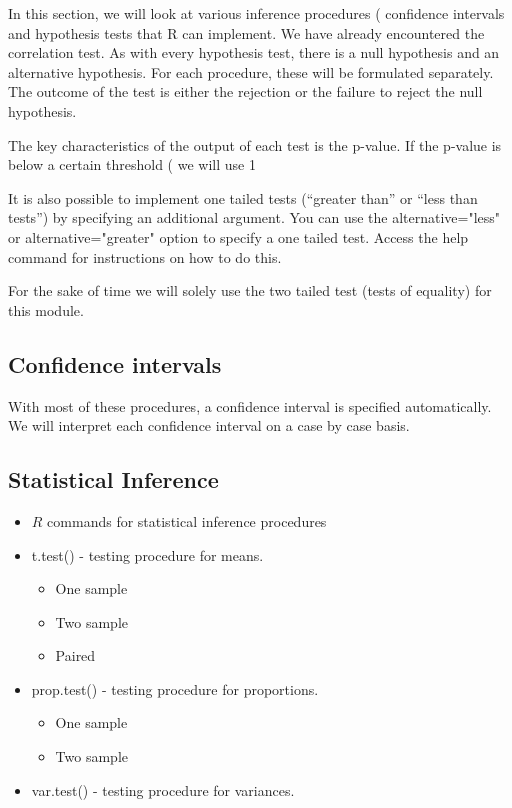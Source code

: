 \documentclass[a4paper,12pt]{article}
\begin{document}
\tableofcontents


In this section, we will look at various inference procedures ( confidence intervals and hypothesis tests that R can implement. We have already encountered the correlation test. 
As with every hypothesis test, there is a null hypothesis and an alternative hypothesis.
For each procedure, these will be formulated separately. The outcome of the test is either the rejection or the failure to reject the null hypothesis.

The key characteristics of the output of each test is the p-value. If the p-value is below a certain threshold ( we will use 1%

It is also possible to implement one tailed tests (“greater than” or “less than tests”) by specifying an additional argument. You can use the alternative="less" or alternative="greater" option to specify a one tailed test. Access the help command for instructions on how to do this. 

For the sake of time we will solely use the two tailed test (tests of equality) for this 
module.

\subsection{Confidence intervals}
With most of these procedures, a confidence interval is specified automatically. We will interpret each confidence interval on a case by case basis.


\subsection{Statistical Inference}
\begin{itemize}
\item $R$ commands for statistical inference procedures \item
t.test() - testing procedure for means.
\begin{itemize}
\item One sample \item Two sample \item Paired
\end{itemize}
\item prop.test() - testing procedure for proportions.
\begin{itemize}
\item One sample \item Two sample
\end{itemize}
\item var.test() - testing procedure for variances.
\end{itemize}
\end{document}
